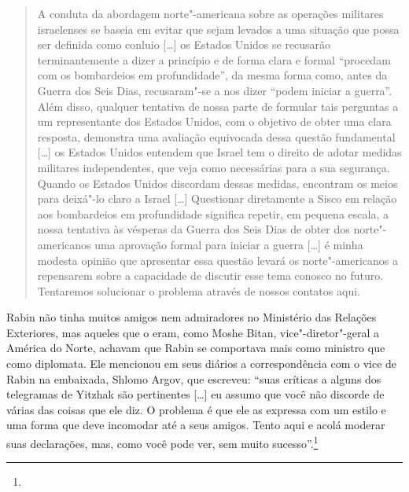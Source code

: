 \begin{quote}
A conduta da abordagem norte"-americana sobre as operações militares
israelenses se baseia em evitar que sejam levados a uma situação que
possa ser definida como conluio {[}\ldots{}{]} os Estados Unidos se recusarão
terminantemente a dizer a princípio e de forma clara e formal ``procedam
com os bombardeios em profundidade'', da mesma forma como, antes da
Guerra dos Seis Dias, recusaram"-se a nos dizer ``podem iniciar a
guerra''. Além disso, qualquer tentativa de nossa parte de formular tais
perguntas a um representante dos Estados Unidos, com o objetivo de obter
uma clara resposta, demonstra uma avaliação equivocada dessa questão
fundamental {[}\ldots{}{]} os Estados Unidos entendem que Israel tem o direito de adotar medidas
militares independentes, que veja como necessárias para a sua segurança.
Quando os Estados Unidos discordam dessas medidas, encontram os meios
para deixá"-lo claro a Israel {[}\ldots{}{]} Questionar diretamente a Sisco em
relação aos bombardeios em profundidade significa repetir, em pequena
escala, a nossa tentativa às vésperas da Guerra dos Seis Dias de obter
dos norte"-americanos uma aprovação formal para iniciar a guerra {[}\ldots{}{]} é
minha modesta opinião que apresentar essa questão levará os
norte"-americanos a repensarem sobre a capacidade de discutir esse tema
conosco no futuro. Tentaremos solucionar o problema através de nossos
contatos aqui.
\end{quote}


Rabin não tinha muitos amigos nem admiradores no Ministério das Relações
Exteriores, mas aqueles que o eram, como Moshe Bitan, vice"-diretor"-geral
a América do Norte, achavam que Rabin se comportava mais como
ministro que como diplomata. Ele mencionou em seus diários a
correspondência com o vice de Rabin na embaixada, Shlomo Argov, que
escreveu: ``suas críticas a alguns dos telegramas de Yitzhak são
pertinentes {[}\ldots{}{]} eu assumo que você não discorde de várias das coisas que
ele diz. O problema é que ele as expressa com um estilo e uma forma que
deve incomodar até a seus amigos. Tento aqui e acolá moderar suas
declarações, mas, como você pode ver, sem muito sucesso''.\footnote{}

